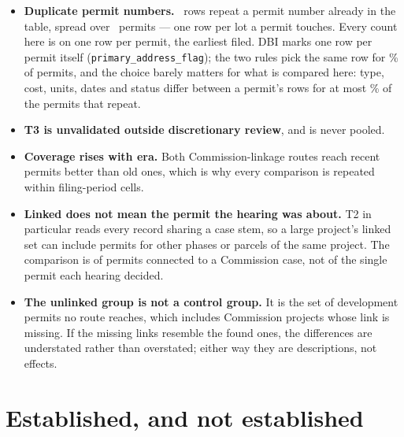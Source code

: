\documentclass[11pt]{article}
\begin{document}
\begin{itemize}
\item \textbf{Duplicate permit numbers.} \pcRowsRepeating\ rows repeat a permit number already
in the table, spread over \pcPermitsRepeating\ permits --- one row per lot a permit touches.
Every count here is on one row per permit, the earliest filed. DBI marks one row per permit
itself (\texttt{primary\_address\_flag}); the two rules pick the same row for \pcRulesAgree\%
of permits, and the choice barely matters for what is compared here: type, cost, units,
dates and status differ between a permit's rows for at most \pcFieldsDiffer\% of the
permits that repeat.
\item \textbf{T3 is unvalidated outside discretionary review}, and is never pooled.
\item \textbf{Coverage rises with era.} Both Commission-linkage routes reach recent permits
better than old ones, which is why every comparison is repeated within filing-period cells.
\item \textbf{Linked does not mean the permit the hearing was about.} T2 in particular reads
every record sharing a case stem, so a large project's linked set can include permits for other
phases or parcels of the same project. The comparison is of permits connected to a Commission case, not of the single permit
each hearing decided.
\item \textbf{The unlinked group is not a control group.} It is the set of development permits
no route reaches, which includes Commission projects whose link is missing. If the missing
links resemble the found ones, the differences are understated rather than overstated; either
way they are descriptions, not effects.
\end{itemize}

\section{Established, and not established}
\end{document}
